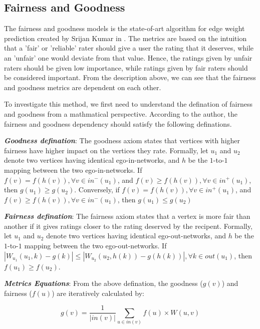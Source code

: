 
\subsection{Fairness and Goodness}

The fairness and goodness models is the state-of-art algorithm for 
edge weight prediction created by Srijan Kumar in \cite{shahriari2014ranking}.
The metrics are based on the intuition that a 'fair' or 'reliable' 
rater should give a user the rating that it deserves, while an 'unfair'
one would deviate from that value. Hence, the ratings given by unfair 
raters should be given low importance, while ratings given by fair 
raters should be considered important. From the description above,
we can see that the fairness and goodness metrics are dependent on each
other.

To investigate this method, we first need to understand the defination
of fairness and goodness from a mathmatical perspective. According to 
the author, the fairness and goodness dependency should satisfy the 
following definations.

\emph{\textbf{Goodness defination}}: The goodness axiom states that 
vertices with higher fairness have higher impact on the vertices they rate.
Formally, let $u_1$ and $u_2$ denote two vertices having identical ego-in-networks,
and $h$ be the $1$-to-$1$ mapping between the two ego-in-networks. If
$f(v) = f(h(v)), \forall v \in in^-(u_1)$, and $f(v) \geq f(h(v)), \forall v \in in^+(u_1)$,
then $g(u_1) \geq g(u_2)$. Conversely, if $f(v) = f(h(v)), \forall v \in in^+(u_1)$, 
and $f(v) \geq f(h(v)), \forall v \in in^-(u_1)$, then $g(u_1) \leq g(u_2)$

\emph{\textbf{Fairness defination}}: The fairness axiom states that 
a vertex is more fair than another if it gives ratings closer to the rating
deserved by the recipent.
Formally, let $u_1$ and $u_2$ denote two vertices having identical ego-out-networks,
and $h$ be the $1$-to-$1$ mapping between the two ego-out-networks.
If $|W_{u_1}(u_1, k)-g(k)| \leq |W_{u_2}(u_2, h(k))-g(h(k))|, \forall k \in out(u_1)$,
then $f(u_1) \geq f(u_2)$.

\emph{\textbf{Metrics Equations}}: From the above defination, the goodness ($g(v)$) and fairness ($f(u)$) are 
iteratively calculated by:

\begin{equation}
    g(v) = \frac{1}{|in(v)|}\sum_{u \in in(v)}f(u) \times W(u,v)
\end{equation}

